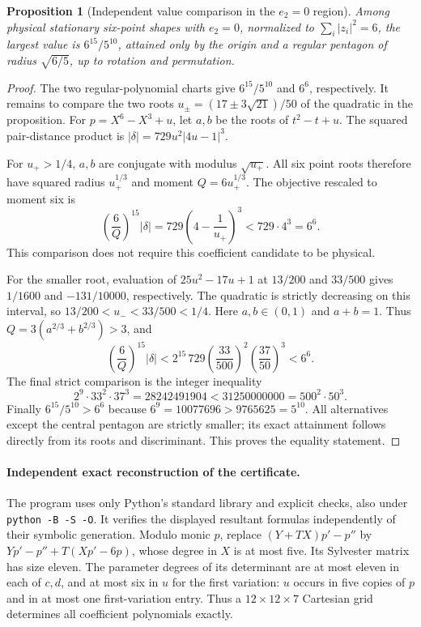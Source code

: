 \documentclass[11pt]{article}
\newtheorem{proposition}[theorem]{Proposition}
\theoremstyle{remark}
\numberwithin{equation}{section}
\begin{document}
\begin{proposition}[Independent value comparison in the $e_2=0$ region]
\label{prop:six-special-value-independent}
Among physical stationary six-point shapes with $e_2=0$, normalized to
$\sum_i|z_i|^2=6$, the largest value is
$6^{15}/5^{10}$, attained only by the origin and a regular pentagon of
radius $\sqrt{6/5}$, up to rotation and permutation.
\end{proposition}
\begin{proof}
The two regular-polynomial charts give $6^{15}/5^{10}$ and $6^6$,
respectively. It remains to compare the two roots
$u_\pm=(17\pm3\sqrt{21})/50$ of the quadratic in the proposition.
For $p=X^6-X^3+u$, let $a,b$ be the roots of $t^2-t+u$.
The squared pair-distance product is
$|\delta|=729u^2|4u-1|^3$.

For $u_+>1/4$, $a,b$ are conjugate with modulus $\sqrt{u_+}$.
All six point roots therefore have squared radius $u_+^{1/3}$ and
moment $Q=6u_+^{1/3}$. The objective rescaled to moment six is
\[
 \left(\frac6Q\right)^{15}|\delta|
 =729\left(4-\frac1{u_+}\right)^3<729\cdot4^3=6^6.
\]
This comparison does not require this coefficient candidate to be
physical.

For the smaller root, evaluation of $25u^2-17u+1$ at $13/200$ and
$33/500$ gives $1/1600$ and $-131/10000$, respectively. The quadratic
is strictly decreasing on this interval, so
$13/200<u_-<33/500<1/4$. Here $a,b\in(0,1)$ and $a+b=1$.
Thus $Q=3(a^{2/3}+b^{2/3})>3$, and
\[
 \left(\frac6Q\right)^{15}|\delta|
 <2^{15}\,729\left(\frac{33}{500}\right)^2
                    \left(\frac{37}{50}\right)^3<6^6.
\]
The final strict comparison is the integer inequality
\[
 2^9\cdot33^2\cdot37^3=28242491904
 <31250000000=500^2\cdot50^3.
\]
Finally $6^{15}/5^{10}>6^6$ because
$6^9=10077696>9765625=5^{10}$. All alternatives except the central
pentagon are strictly smaller; its exact attainment follows directly
from its roots and discriminant. This proves the equality statement.
\end{proof}

\paragraph{Independent exact reconstruction of the certificate.}
The program  uses only Python's
standard library and explicit checks, also under
\texttt{python -B -S -O}. It verifies the displayed resultant formulas
independently of their symbolic generation. Modulo monic $p$, replace
$(Y+TX)p'-p''$ by $Yp'-p''+T(Xp'-6p)$, whose degree in $X$ is at most
five. Its Sylvester matrix has size eleven. The parameter degrees of
its determinant are at most eleven in each of $c,d$, and at most six
in $u$ for the first variation: $u$ occurs in five copies of $p$ and
in at most one first-variation entry. Thus a $12\times12\times7$
Cartesian grid determines all coefficient polynomials exactly.
\end{document}
